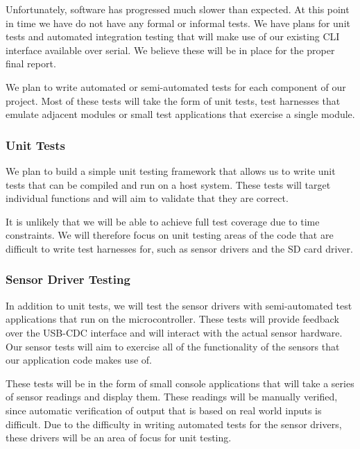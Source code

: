 

Unfortunately, software has progressed much slower than expected.  At this point
in time we have do not have any formal or informal tests.  We have plans for
unit tests and automated integration testing that will make use of our existing
CLI interface available over serial.  We believe these will be in place for the
proper final report.

\iffalse

We plan to write automated or semi-automated tests for each component of our
project. Most of these tests will take the form of unit tests, test harnesses
that emulate adjacent modules or small test applications that exercise a single
module.

\subsubsection{Unit Tests}

We plan to build a simple unit testing framework that allows us to write unit
tests that can be compiled and run on a host system. These tests will target
individual functions and will aim to validate that they are correct.

It is unlikely that we will be able to achieve full test coverage due to time
constraints. We will therefore focus on unit testing areas of the code that
are difficult to write test harnesses for, such as sensor drivers and the SD
card driver.

\subsubsection{Sensor Driver Testing}

In addition to unit tests, we will test the sensor drivers with semi-automated
test applications that run on the microcontroller. These tests will provide
feedback over the USB-CDC interface and will interact with the actual sensor
hardware.  Our sensor tests will aim to exercise all of the functionality of the
sensors that our application code makes use of.

These tests will be in the form of small console applications that will take
a series of sensor readings and display them. These readings will be manually
verified, since automatic verification of output that is based on real world
inputs is difficult. Due to the difficulty in writing automated tests for the
sensor drivers, these drivers will be an area of focus for unit testing.

